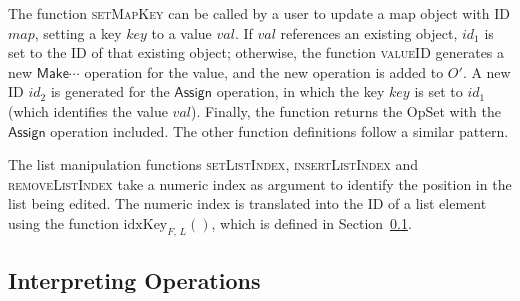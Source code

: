 The function \textsc{setMapKey} can be called by a user to update a map object with ID $\mathit{map}$, setting a key $\mathit{key}$ to a value $\mathit{val}$.
If $\mathit{val}$ references an existing object, $\mathit{id}_1$ is set to the ID of that existing object; otherwise, the function \textsc{valueID} generates a new $\mathsf{Make}\cdots$ operation for the value, and the new operation is added to $O'$.
A new ID $\mathit{id}_2$ is generated for the $\mathsf{Assign}$ operation, in which the key $\mathit{key}$ is set to $\mathit{id}_1$ (which identifies the value $\mathit{val}$).
Finally, the function returns the OpSet with the $\mathsf{Assign}$ operation included.
The other function definitions follow a similar pattern.

The list manipulation functions \textsc{setListIndex}, \textsc{insertListIndex} and \textsc{removeListIndex} take a numeric index as argument to identify the position in the list being edited.
The numeric index is translated into the ID of a list element using the function $\mathrm{idxKey}_{F,\, L}()$, which is defined in Section~\ref{sec:datatypes-interp}.

\subsection{Interpreting Operations}\label{sec:datatypes-interp}

